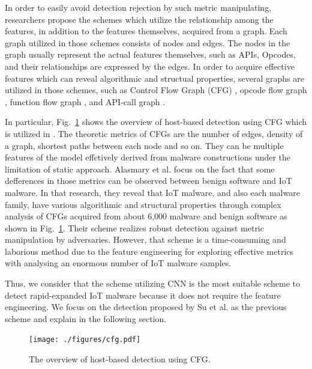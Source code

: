 \documentclass{ieeeaccess}
\newcommand{\myfigurename}{Fig.}
\begin{document}
In order to easily avoid detection rejection by such metric manipulating, researchers \cite{cfg, cfg2, op-graph, func-graph, api-graph} propose the schemes which utilize the relationship among the features, in addition to the features themselves, acquired from a graph.
Each graph utilized in those schemes consists of nodes and edges.
The nodes in the graph usually represent the actual features themselves, such as APIs, Opcodes, and their relationships are expressed by the edges.
In order to acquire effective features which can reveal algorithmic and structual properties, several graphs are utilized in those schemes, such as Control Flow Graph (CFG) \cite{cfg, cfg2}, opcode flow graph \cite{op-graph}, function flow graph \cite{func-graph}, and API-call graph \cite{api-graph}.

In particular, \myfigurename~\ref{fig:cfg} shows the overview of host-based detection using CFG which is utilized in \cite{cfg, cfg2}.
The theoretic metrics of CFGs are the number of edges, density of a graph, shortest paths between each node and so on.
They can be multiple features of the model effctively derived from malware constructions under the limitation of static approach.
Alasmary et al. \cite{cfg} focus on the fact that some defferences in those metrics can be observed between benign software and IoT malware.
In that research, they reveal that IoT malware, and also each malware family, have various algorithmic and structural properties through complex analysis of CFGs acquired from about 6,000 malware and benign software as shown in \myfigurename~\ref{fig:cfg}.
Their scheme realizes robust detection against metric manipulation by adversaries.
However, that scheme is a time-consuming and laborious method due to the feature engineering for exploring effective metrics with analysing an enormous number of IoT malware samples.

Thus, we consider that the scheme utilizing CNN is the most suitable scheme to detect rapid-expanded IoT malware because it does not require the feature engineering.
We focus on the detection proposed by Su et al. \cite{previous} as the previous scheme and explain in the following section.
\begin{figure}[t]
 \centering
 \texttt{[image: ./figures/cfg.pdf]}
 \caption{The overview of host-based detection using CFG.} 
 \label{fig:cfg}
\end{figure}
\end{document}

